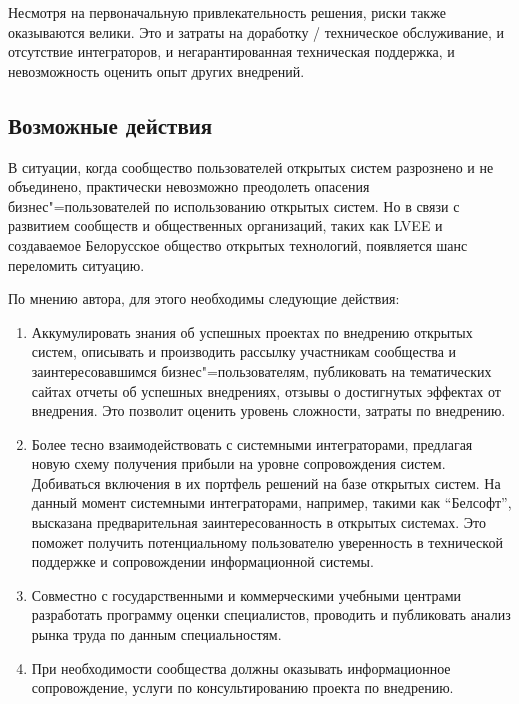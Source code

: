 \documentclass[10pt, a5paper]{article}
\begin{document}
Несмотря на первоначальную привлекательность решения, риски также оказываются велики. Это и затраты на доработку / техническое обслуживание, и отсутствие интеграторов, и негарантированная техническая поддержка, и невозможность оценить опыт других внедрений.

\subsection*{Возможные действия}

В ситуации, когда сообщество пользователей открытых систем разрознено и не объединено, практически невозможно преодолеть опасения бизнес"=пользователей по использованию открытых систем.
Но в связи с развитием сообществ и общественных организаций, таких как LVEE и создаваемое Белорусское общество открытых технологий, появляется шанс переломить ситуацию.

По мнению автора, для этого необходимы следующие действия:

\begin{enumerate}
  \item Аккумулировать знания об успешных проектах по внедрению открытых систем, описывать и производить рассылку участникам сообщества и заинтересовавшимся бизнес"=пользователям, публиковать на тематических сайтах отчеты об успешных внедрениях, отзывы о достигнутых эффектах от внедрения. Это позволит оценить уровень сложности, затраты по внедрению.
  \item Более тесно взаимодействовать с системными интеграторами, предлагая новую схему получения прибыли на уровне сопровождения систем. Добиваться включения в их портфель решений на базе открытых систем. На данный момент системными интеграторами, например, такими как ``Белсофт'', высказана предварительная заинтересованность в открытых системах. Это поможет получить потенциальному пользователю уверенность в технической поддержке и сопровождении информационной системы.
  \item Совместно с государственными и коммерческими учебными центрами разработать программу оценки специалистов, проводить и публиковать анализ рынка труда по данным специальностям.
  \item При необходимости сообщества должны оказывать информационное сопровождение, услуги по консультированию проекта по внедрению.
\end{enumerate}
\end{document}
